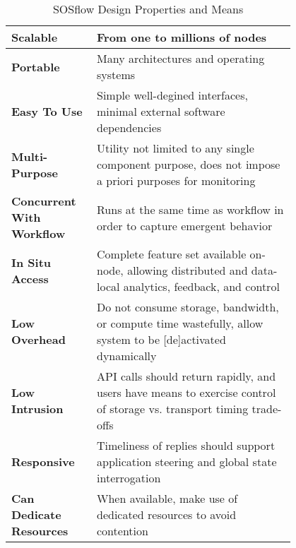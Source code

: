

\begin{table*}[t]
\renewcommand{\arraystretch}{1.3}
\caption{SOSflow Design Properties and Means}
\label{tabledesign}
\centering
\begin{tabular}{|p{0.2\linewidth}|p{0.6\linewidth}|}
\hline %
%
\textbf{Scalable}
&
From one to millions of nodes
\\
%
%
\hline %
%
\textbf{Portable}
&
Many architectures and operating systems
\\
%
%
\hline %
%
\textbf{Easy To Use}
& 
Simple well-degined interfaces, minimal external software dependencies
\\
%
%
\hline %
%
\textbf{Multi-Purpose}
&
Utility not limited to any single component purpose, does not impose
a priori purposes for monitoring
\\
%
%
\hline %
%
\textbf{Concurrent With Workflow}
&
Runs at the same time as workflow in order to capture emergent
behavior
\\
%
%
\hline %
%
\textbf{In Situ Access}
&
Complete feature set available on-node, allowing distributed and
data-local analytics, feedback, and control
\\
%
%
\hline %
%
\textbf{Low Overhead}
&
Do not consume storage, bandwidth, or compute time wastefully, allow
system to be [de]activated dynamically
\\
%
%
\hline %
%
\textbf{Low Intrusion}
&
API calls should return rapidly, and users have means to exercise
control of storage vs. transport timing trade-offs
\\
%
%
\hline %
%
\textbf{Responsive}
&
Timeliness of replies should support application steering and global
state interrogation
\\
%
%
\hline %
%
\textbf{Can Dedicate Resources}
&
When available, make use of dedicated resources to avoid contention
\\


\end{tabular}
\end{table*}
